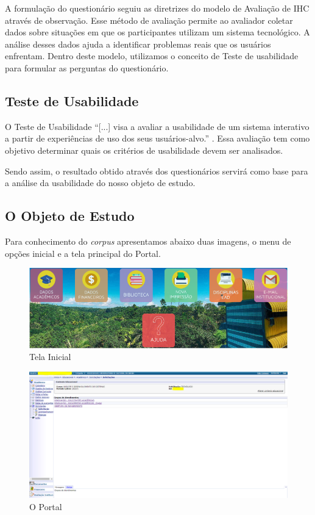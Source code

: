 \documentclass[12pt]{article}
\begin{document}
A formulação do questionário  seguiu as diretrizes do modelo de Avaliação de IHC através de observação. Esse método de avaliação permite ao avaliador coletar dados sobre situações em que os participantes utilizam um sistema tecnológico. A análise desses dados ajuda a identificar problemas reais que os usuários enfrentam. Dentro deste modelo, utilizamos o conceito de Teste de usabilidade para formular as perguntas do questionário.

\subsection{Teste de Usabilidade} 
O Teste de Usabilidade “[...] visa a avaliar a usabilidade de um sistema interativo a partir de experiências de uso dos seus usuários-alvo.” . Essa avaliação tem como objetivo determinar quais os critérios de usabilidade devem ser analisados. 

Sendo assim, o resultado obtido através dos questionários servirá como base para a análise da usabilidade do nosso objeto de estudo.

\subsection{O Objeto de Estudo}
Para conhecimento do \textit{corpus }apresentamos abaixo duas imagens, o menu de opções inicial e a tela principal do Portal.

\begin{figure}[!htb]
\centering
\includegraphics[scale=0.35,frame]{img1.png}
\caption{Tela Inicial}
\label{fig:imgTelaInicial}
\end{figure}

\begin{figure}[!htb]
\centering
\includegraphics[scale=0.25,frame]{img2.png}
\caption{O Portal}
\label{fig:imgOPortal}
\end{figure}
\FloatBarrier
\end{document}
